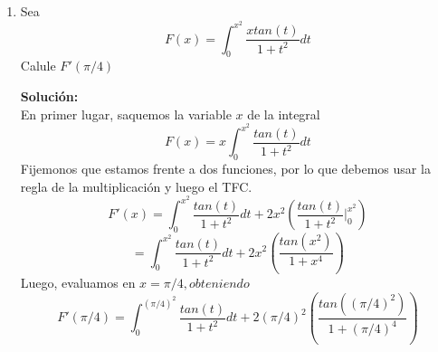 \documentclass[12pt]{article}
\newenvironment{solucion}
{\begin{mdframed}[backgroundcolor=black!10]
		{\bf Solución:}\\
	}
	{
	\end{mdframed}
}
\newenvironment{preguntas}
{\begin{enumerate}\itemsep12pt
	}
	{
	\end{enumerate}
}
\newcommand{\ev}{\Big|}
\begin{document}
\begin{preguntas}
\begin{solucion}
\begin{enumerate}[a)]
\item $\displaystyle\int 2xdx = x^2 + c$
\item $\displaystyle\int e^{ln(x^2)}dx = \displaystyle\int x^2dx = \dfrac{x^3}{3} + c$
\item $\displaystyle\int 4cos(2x)dx = 2sen(2x) + c$
\item $\displaystyle\int 6e^{3x}dx = 2e^{3x} + c$
\end{enumerate}
\end{solucion}
\item Sea
$$F(x) = \displaystyle\int_0^{x^2} \dfrac{xtan(t)}{1+t^2}dt$$
	Calule $F'(\pi /4)$
\begin{solucion}
En primer lugar, saquemos la variable $x$ de la integral
		$$F(x) = x\displaystyle\int_0^{x^2} \dfrac{tan(t)}{1+t^2}dt$$
		Fijemonos que estamos frente a dos funciones, por lo que debemos usar la regla de la multiplicación y luego el TFC.
		$$F'(x) = \displaystyle\int_0^{x^2} \dfrac{tan(t)}{1+t^2}dt + 2x^2\left(\dfrac{tan(t)}{1+t^2}\ev_0^{x^2}\right)$$
		$$= \displaystyle\int_0^{x^2} \dfrac{tan(t)}{1+t^2}dt + 2x^2\left(\dfrac{tan(x^2)}{1+x^4}\right)$$
		Luego, evaluamos en $x = \pi /4, obteniendo$
		$$F'(\pi /4) = \displaystyle\int_0^{(\pi /4)^2} \dfrac{tan(t)}{1+t^2}dt + 2(\pi /4)^2\left(\dfrac{tan((\pi /4)^2)}{1+(\pi /4)^4}\right)$$
\end{solucion}
\end{preguntas}
\end{document}
